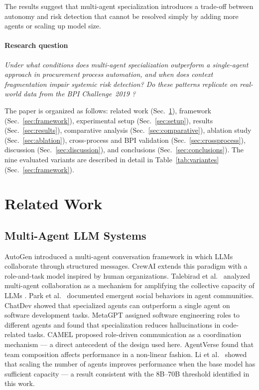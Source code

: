 \documentclass[preprint,12pt,numrefs]{elsarticle}
\begin{document}
The results suggest that multi-agent specialization introduces a
trade-off between autonomy and risk detection that cannot be resolved
simply by adding more agents or scaling up model size.

\paragraph{Research question}
\textit{Under what conditions does multi-agent specialization outperform
a single-agent approach in procurement process automation, and when does
context fragmentation impair systemic risk detection? Do these patterns
replicate on real-world data from the BPI Challenge~2019
\citep{vandongen2019bpi}?}

The paper is organized as follows: related work
(Sec.~\ref{sec:related}), framework (Sec.~\ref{sec:framework}),
experimental setup (Sec.~\ref{sec:setup}), results
(Sec.~\ref{sec:results}), comparative analysis
(Sec.~\ref{sec:comparative}), ablation study
(Sec.~\ref{sec:ablation}), cross-process and BPI validation
(Sec.~\ref{sec:crossprocess}), discussion
(Sec.~\ref{sec:discussion}), and conclusions
(Sec.~\ref{sec:conclusions}). The nine evaluated variants are
described in detail in Table~\ref{tab:variantes}
(Sec.~\ref{sec:framework}).
\section{Related Work}
\label{sec:related}

\subsection{Multi-Agent LLM Systems}

AutoGen \citep{wu2023autogen} introduced a multi-agent conversation
framework in which LLMs collaborate through structured messages.
CrewAI \citep{crewai2024} extends this paradigm with a role-and-task
model inspired by human organizations. Talebirad et al.\
\citep{talebirad2023} analyzed multi-agent collaboration as a mechanism
for amplifying the collective capacity of LLMs \citep{Wang2024survey}.
Park et al.\ \citep{park2023generative} documented emergent social
behaviors in agent communities. ChatDev \citep{qian2023chatdev} showed
that specialized agents can outperform a single agent on software
development tasks. MetaGPT \citep{Hong2024metagpt} assigned software
engineering roles to different agents and found that specialization
reduces hallucinations in code-related tasks. CAMEL \citep{Li2023camel}
proposed role-driven communication as a coordination mechanism --- a
direct antecedent of the design used here. AgentVerse
\citep{Chen2023agentverse} found that team composition affects
performance in a non-linear fashion. Li et al.\
\citep{Li2024moreagents} showed that scaling the number of agents
improves performance when the base model has sufficient capacity ---
a result consistent with the 8B--70B threshold identified in this work.
\end{document}
